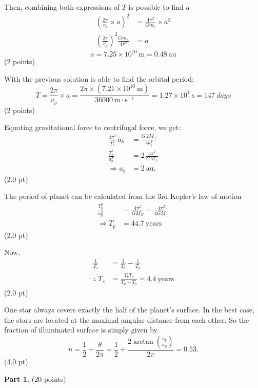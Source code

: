 \begin{description}
Then, combining both expressions of $T$ is possible to find $a$
\begin{align*}
\left(\frac{2\pi}{v_p}\times a\right)^{2} &= \frac{4\pi^2}{Gm_s}\times a^3\\
\left(\frac{2\pi}{v_p}\right)^{2}\frac{Gm_s}{4\pi^2} &= a
\end{align*}
\[ a = 7.25\times10^{10}\ \mathrm{m} = 0.48\ \mathrm{au} \]
\hfill(2 points)

With the previous solution is able to find the orbital period:
\[ T = \frac{2\pi}{v_p}\times a
     = \frac{2\pi\times(7.21\times10^{10}\ \mathrm{m})}{36000\ \mathrm{m\cdot s^{-1}}}
     = 1.27\times10^{7}\ \mathrm{s} = 147\ days \]
\hfill(2 points)
\end{description}

Equating gravitational force to centrifugal force, we get:
\begin{align*}
\frac{4\pi^2}{T_b^2}\,a_b &= \frac{G\,2M_\odot}{4a_b^2}\\
\frac{T_b^2}{a_b^3} &= 2\,\frac{4\pi^2}{GM_\odot}\\
\Longrightarrow a_b &= 2\ \mathrm{au}.
\end{align*}
\hfill(2.0 pt)

The period of planet can be calculated from the 3rd Kepler's law of motion
\begin{align*}
\frac{T_p^2}{a_p^3} &= \frac{4\pi^2}{GM_\Sigma} = \frac{4\pi^2}{4GM_\odot}\\
\Longrightarrow T_p &= 44.7\ \mathrm{years}
\end{align*}
\hfill(2.0 pt)

Now,
\begin{align*}
\frac{1}{T_s} &= \frac{1}{T_b} - \frac{1}{T_p}\\
\therefore\ T_s &= \frac{T_b T_p}{T_p - T_b} = 4.4\ \mathrm{years}
\end{align*}
\hfill(2.0 pt)

One star always covers exactly the half of the planet's surface. In the best
case, the stars are located at the maximal angular distance from each other.
So the fraction of illuminated surface is simply given by
\[ n = \frac{1}{2} + \frac{\theta}{2\pi}
     = \frac{1}{2} + \frac{2\arctan\!\left(\frac{a_b}{a_p}\right)}{2\pi}
     = 0.53. \]
\hfill(4.0 pt)

\noindent\textbf{Part 1.} \hfill(20 points)

